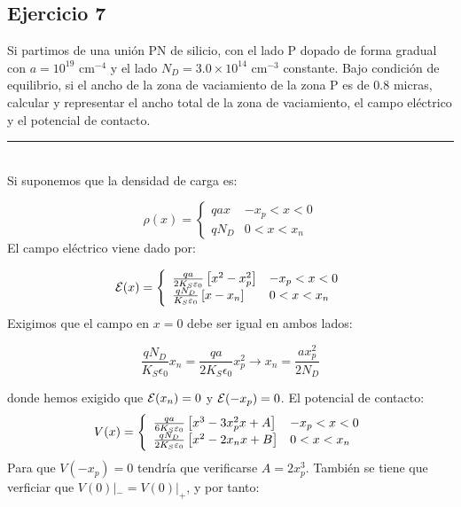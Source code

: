 \subsection{Ejercicio 7} 

Si partimos de una unión PN de silicio, con el lado P dopado de forma gradual con 
$a = 10^{19}$ cm$^{-4}$ y el lado $N_D = 3.0 \times 10^{14}$ cm$^{-3}$ constante. 
Bajo condición de equilibrio, si el ancho de la zona de vaciamiento de la zona P es 
de 0.8 micras, calcular y representar el ancho total de la zona de vaciamiento, 
el campo eléctrico y el potencial de contacto.



\rule{\textwidth}{0.1pt} \\[2pt]

Si suponemos que la densidad de carga es:

\begin{equation*}
    \rho (x) = \left\lbrace \begin{array}{ll}
        q a x & -x_p < x < 0  \\ 
        q N_D & 0 < x < x_n  
    \end{array} \right.
\end{equation*}
El campo eléctrico viene dado por:

\begin{equation*}
    \mathcal{E} (x) =  \left\lbrace \begin{array}{ll}
        \frac{qa}{2K_S\varepsilon_0} \left[ x^2 - x_p^2 \right] & -x_p < x < 0  \\ 
        \frac{qN_D}{K_S\varepsilon_0} \left[ x- x_n \right] & 0 < x < x_n  
    \end{array} \right.
\end{equation*}
Exigimos que el campo en $x=0$ debe ser igual en ambos lados:

\begin{equation}
    \frac{qN_D}{K_S \epsilon_0} x_n = \frac{qa}{2K_S\epsilon_0} x_p^2 \rightarrow x_n = \frac{a x_p^2}{2 N_D}
\end{equation}


donde hemos exigido que $\mathcal{E}(x_n)=0$ y $\mathcal{E}(-x_p)=0$. El potencial de contacto:
\begin{equation*}
    V (x) =  \left\lbrace \begin{array}{ll}
        \frac{qa}{6K_S\varepsilon_0} \left[ x^3 - 3x_p^2 x + A \right] & -x_p < x < 0  \\ 
        \frac{qN_D}{2K_S\varepsilon_0} \left[ x^2 - 2x_n x + B \right] & 0 < x < x_n  
    \end{array} \right.
\end{equation*}
Para que $V(-x_p)=0$ tendría que verificarse $A=2x_p^3$. También se tiene que verficiar que $V(0)|_{-}=V(0)|_{+}$, y por tanto: 

